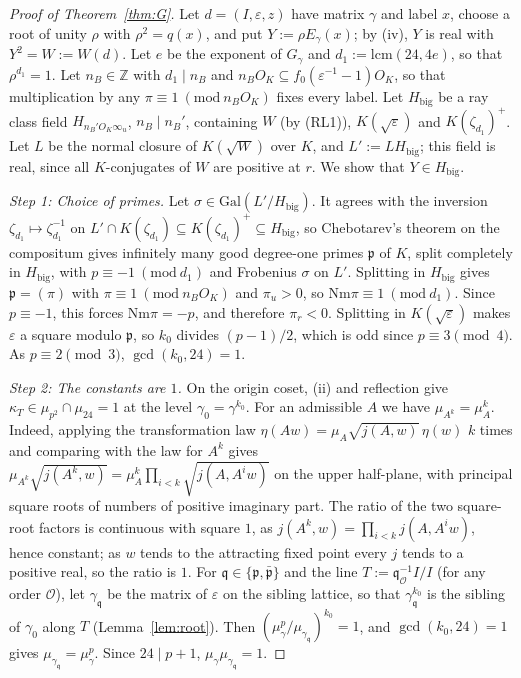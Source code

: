 \documentclass[11pt]{amsart}
\numberwithin{equation}{section}
\theoremstyle{plain}
\theoremstyle{definition}
\theoremstyle{remark}
\newcommand{\Nm}{\mathrm{Nm}}
\begin{document}
\begin{proof}[Proof of Theorem~\ref{thm:G}]
Let \(d=(I,\varepsilon,z)\) have matrix \(\gamma\) and label \(x\), choose a root of unity \(\rho\) with \(\rho^2=q(x)\), and put \(Y:=\rho E_\gamma(x)\); by (iv), \(Y\) is real with \(Y^2=W:=W(d)\). Let \(e\) be the exponent of \(G_\gamma\) and \(d_1:=\mathrm{lcm}(24,4e)\), so that \(\rho^{d_1}=1\). Let \(n_B\in\mathbb Z\) with \(d_1\mid n_B\) and \(n_BO_K\subseteq f_0(\varepsilon^{-1}-1)O_K\), so that multiplication by any \(\pi\equiv1\ (\mathrm{mod}\ n_BO_K)\) fixes every label. Let \(H_{\mathrm{big}}\) be a ray class field \(H_{n_B'O_K\infty_u}\), \(n_B\mid n_B'\), containing \(W\) (by (RL1)), \(K(\sqrt\varepsilon)\) and \(K(\zeta_{d_1})^+\). Let \(L\) be the normal closure of \(K(\sqrt W)\) over \(K\), and \(L':=LH_{\mathrm{big}}\); this field is real, since all \(K\)-conjugates of \(W\) are positive at \(r\). We show that \(Y\in H_{\mathrm{big}}\).

\emph{Step 1: Choice of primes.} Let \(\sigma\in\mathrm{Gal}(L'/H_{\mathrm{big}})\). It agrees with the inversion \(\zeta_{d_1}\mapsto\zeta_{d_1}^{-1}\) on \(L'\cap K(\zeta_{d_1})\subseteq K(\zeta_{d_1})^+\subseteq H_{\mathrm{big}}\), so Chebotarev's theorem on the compositum gives infinitely many good degree-one primes \(\mathfrak p\) of \(K\), split completely in \(H_{\mathrm{big}}\), with \(p\equiv-1\ (\mathrm{mod}\ d_1)\) and Frobenius \(\sigma\) on \(L'\). Splitting in \(H_{\mathrm{big}}\) gives \(\mathfrak p=(\pi)\) with \(\pi\equiv1\ (\mathrm{mod}\ n_BO_K)\) and \(\pi_u>0\), so \(\Nm\pi\equiv1\ (\mathrm{mod}\ d_1)\). Since \(p\equiv-1\), this forces \(\Nm\pi=-p\), and therefore \(\pi_r<0\). Splitting in \(K(\sqrt\varepsilon)\) makes \(\varepsilon\) a square modulo \(\mathfrak p\), so \(k_0\) divides \((p-1)/2\), which is odd since \(p\equiv3\pmod 4\). As \(p\equiv2\pmod 3\), \(\gcd(k_0,24)=1\).

\emph{Step 2: The constants are \(1\).} On the origin coset, (ii) and reflection give \(\kappa_T\in\mu_{p^2}\cap\mu_{24}=1\) at the level \(\gamma_0=\gamma^{k_0}\). For an admissible \(A\) we have \(\mu_{A^k}=\mu_A^k\). Indeed, applying the transformation law \(\eta(Aw)=\mu_A\sqrt{j(A,w)}\,\eta(w)\) \(k\) times and comparing with the law for \(A^k\) gives \(\mu_{A^k}\sqrt{j(A^k,w)}=\mu_A^k\prod_{i<k}\sqrt{j(A,A^iw)}\) on the upper half-plane, with principal square roots of numbers of positive imaginary part. The ratio of the two square-root factors is continuous with square \(1\), as \(j(A^k,w)=\prod_{i<k}j(A,A^iw)\), hence constant; as \(w\) tends to the attracting fixed point every \(j\) tends to a positive real, so the ratio is \(1\). For \(\mathfrak q\in\{\mathfrak p,\bar{\mathfrak p}\}\) and the line \(T:=\mathfrak q_{\mathcal O}^{-1}I/I\) (for any order \(\mathcal O\)), let \(\gamma_{\mathfrak q}\) be the matrix of \(\varepsilon\) on the sibling lattice, so that \(\gamma_{\mathfrak q}^{k_0}\) is the sibling of \(\gamma_0\) along \(T\) (Lemma~\ref{lem:root}). Then \((\mu_\gamma^p/\mu_{\gamma_{\mathfrak q}})^{k_0}=1\), and \(\gcd(k_0,24)=1\) gives \(\mu_{\gamma_{\mathfrak q}}=\mu_\gamma^p\). Since \(24\mid p+1\), \(\mu_\gamma\mu_{\gamma_{\mathfrak q}}=1\).


\end{proof}
\end{document}

